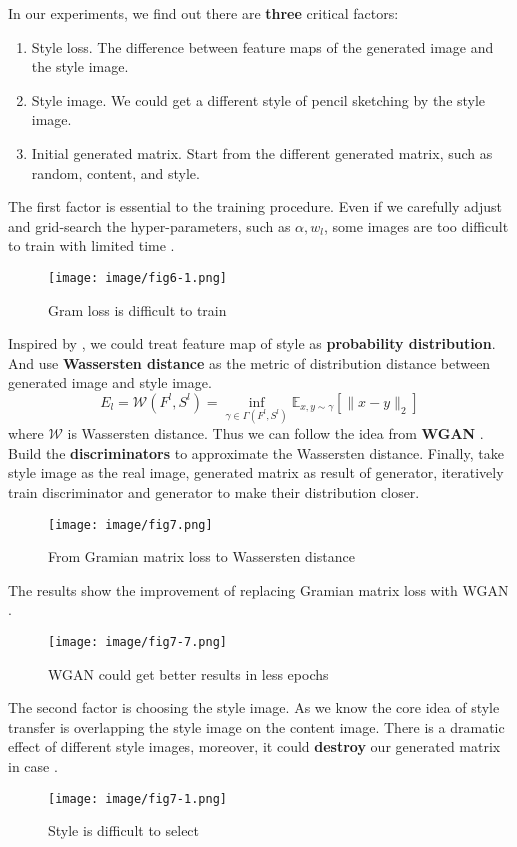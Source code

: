 In our experiments, we find out there are \textbf{three} critical factors:
\begin{enumerate}
  \item Style loss. The difference between feature maps of the generated image and the style image.
  \item Style image. We could get a different style of pencil sketching by the style image.
  \item Initial generated matrix. Start from the different generated matrix, such as random, content, and style.
\end{enumerate}
The first factor is essential to the training procedure. Even if we carefully adjust and grid-search the hyper-parameters, such as \(\alpha, w_{l}\), some images are too difficult to train with limited time .
\begin{figure}
  \centering
  \texttt{[image: image/fig6-1.png]}
  \caption{Gram loss is difficult to train}
  \label{fig6-1}
\end{figure}

Inspired by \cite{2020_Huang_sdf}, we could treat feature map of style as \textbf{probability distribution}. And use \textbf{Wassersten distance} as the metric of distribution distance between generated image and style image.
\[
E_{l} = \mathcal{W}(F^{l}, S^{l})=\inf_{\gamma \in \Gamma(F^{l}, S^{l})} \mathbb{E}_{x, y \sim \gamma} \left[\|x - y \|_{2} \right]
\]
where \(\mathcal{W}\) is Wassersten distance.
Thus we can follow the idea from \textbf{WGAN} \cite{2017pmlr-arjovsky-wgan}. Build the \textbf{discriminators} to approximate the Wassersten distance.
Finally, take style image as the real image, generated matrix as result of generator, iteratively train discriminator and generator to make their distribution closer.
\begin{figure}
  \centering
  \texttt{[image: image/fig7.png]}
  \caption{From Gramian matrix loss to Wassersten distance}
  \label{fig7}
\end{figure}
The results show the improvement of replacing Gramian matrix loss with WGAN .
\begin{figure}
  \centering
  \texttt{[image: image/fig7-7.png]}
  \caption{WGAN could get better results in less epochs}
  \label{fig7-7}
\end{figure}

The second factor is choosing the style image. As we know the core idea of style transfer is \alert{overlapping} the style image on the content image. There is a dramatic effect of different style images, moreover, it could \textbf{destroy} our generated matrix in case .
\begin{figure}
  \centering
  \texttt{[image: image/fig7-1.png]}
  \caption{Style is difficult to select}
  \label{fig7-1}
\end{figure}

